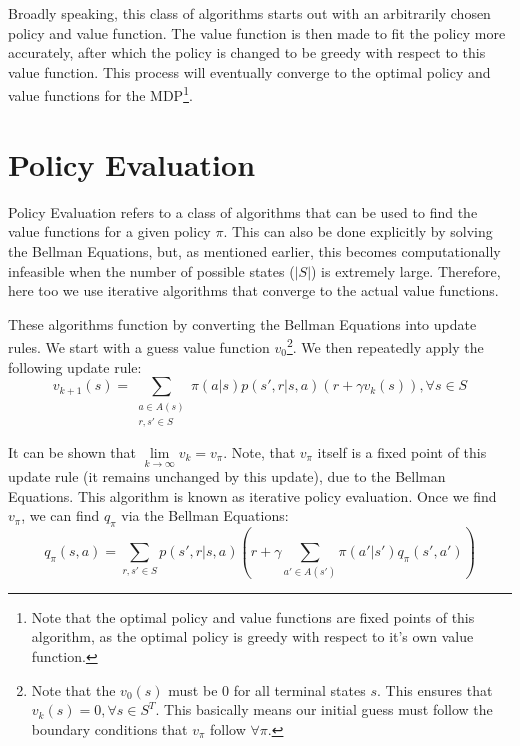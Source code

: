 \documentclass[12pt]{report}
\begin{document}
Broadly speaking, this class of algorithms starts out with an arbitrarily chosen policy and value function. The value function is then made to fit the policy more accurately, after which the policy is changed to be 
greedy with respect to this value function. This process will eventually converge to the optimal policy and value functions for the MDP\footnote{Note that the optimal policy and value functions are fixed points of this algorithm, as the optimal policy is greedy with respect to it's own value function.}.

\section{Policy Evaluation}
Policy Evaluation refers to a class of algorithms that can be used to find the value functions for a given policy $\pi$. This can also be done explicitly by solving the Bellman Equations, but, as mentioned earlier, this becomes 
computationally infeasible when the number of possible states ($\left|S\right|$) is extremely large. Therefore, here too we use iterative algorithms that converge to the actual value functions.

These algorithms function by converting the Bellman Equations into update rules. We start with a guess value function $v_{0}$\footnote{Note that the $v_{0}(s)$ must be $0$ for all terminal states $s$. This ensures that $v_{k}(s) = 0, \forall s \in S^{T}$. This basically means our initial guess must follow the boundary conditions that $v_{\pi}$ follow $\forall \pi$.}. We then repeatedly apply the following update rule:
\begin{equation}
    v_{k + 1}(s) = \sum\limits_{\substack{a \in A(s)\\r, s' \in S}} \pi(a | s) p(s', r | s, a) (r + \gamma v_{k}(s)), \forall s \in S
\end{equation}

It can be shown that $\lim\limits_{k \rightarrow \infty} v_{k} = v_{\pi}$. Note, that $v_{\pi}$ itself is a fixed point of this update rule (it remains unchanged by this update), due to the Bellman Equations. This algorithm 
is known as iterative policy evaluation. Once we find $v_{\pi}$, we can find $q_{\pi}$ via the Bellman Equations:
\begin{equation}
    q_{\pi}(s, a) = \sum\limits_{r, s' \in S} p(s', r | s, a)(r + \gamma\sum\limits_{a' \in A(s')}\pi(a' | s') q_{\pi}(s', a'))
\end{equation}
\end{document}
